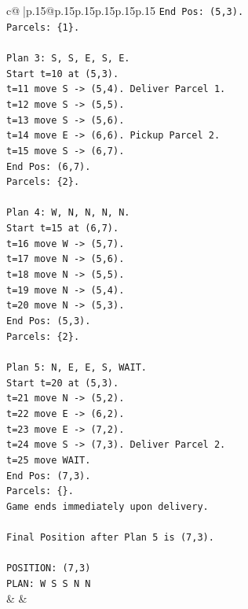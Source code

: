 \documentclass{article}
\begin{document}
{\begin{supertabular}{c@{$\;$}|p{.15\linewidth}@{}p{.15\linewidth}p{.15\linewidth}p{.15\linewidth}p{.15\linewidth}p{.15\linewidth}}
{{{\texttt{End Pos: (5,3).} \\
\texttt{Parcels: \{1\}.} \\
\\ 
\texttt{Plan 3: S, S, E, S, E.} \\
\texttt{Start t=10 at (5,3).} \\
\texttt{t=11 move S {-}> (5,4). Deliver Parcel 1.} \\
\texttt{t=12 move S {-}> (5,5).} \\
\texttt{t=13 move S {-}> (5,6).} \\
\texttt{t=14 move E {-}> (6,6). Pickup Parcel 2.} \\
\texttt{t=15 move S {-}> (6,7).} \\
\texttt{End Pos: (6,7).} \\
\texttt{Parcels: \{2\}.} \\
\\ 
\texttt{Plan 4: W, N, N, N, N.} \\
\texttt{Start t=15 at (6,7).} \\
\texttt{t=16 move W {-}> (5,7).} \\
\texttt{t=17 move N {-}> (5,6).} \\
\texttt{t=18 move N {-}> (5,5).} \\
\texttt{t=19 move N {-}> (5,4).} \\
\texttt{t=20 move N {-}> (5,3).} \\
\texttt{End Pos: (5,3).} \\
\texttt{Parcels: \{2\}.} \\
\\ 
\texttt{Plan 5: N, E, E, S, WAIT.} \\
\texttt{Start t=20 at (5,3).} \\
\texttt{t=21 move N {-}> (5,2).} \\
\texttt{t=22 move E {-}> (6,2).} \\
\texttt{t=23 move E {-}> (7,2).} \\
\texttt{t=24 move S {-}> (7,3). Deliver Parcel 2.} \\
\texttt{t=25 move WAIT.} \\
\texttt{End Pos: (7,3).} \\
\texttt{Parcels: \{\}.} \\
\texttt{Game ends immediately upon delivery.} \\
\\ 
\texttt{Final Position after Plan 5 is (7,3).} \\
\\ 
\texttt{POSITION: (7,3)} \\
\texttt{PLAN: W S S N N} \\
            }
        }
    }
    & & \\ \\


\end{supertabular}}
\end{document}
